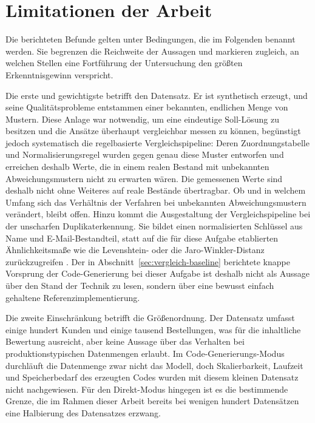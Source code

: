 \section{Limitationen der Arbeit}
\label{sec:limitationen}

Die berichteten Befunde gelten unter Bedingungen, die im Folgenden benannt werden. Sie begrenzen die Reichweite der Aussagen und markieren zugleich, an welchen Stellen eine Fortführung der Untersuchung den größten Erkenntnisgewinn verspricht.

Die erste und gewichtigste betrifft den Datensatz. Er ist synthetisch erzeugt, und seine Qualitätsprobleme entstammen einer bekannten, endlichen Menge von Mustern. Diese Anlage war notwendig, um eine eindeutige Soll-Lösung zu besitzen und die Ansätze überhaupt vergleichbar messen zu können, begünstigt jedoch systematisch die regelbasierte Vergleichspipeline: Deren Zuordnungstabelle und Normalisierungsregel wurden gegen genau diese Muster entworfen und erreichen deshalb Werte, die in einem realen Bestand mit unbekannten Abweichungsmustern nicht zu erwarten wären. Die gemessenen Werte sind deshalb nicht ohne Weiteres auf reale Bestände übertragbar. Ob und in welchem Umfang sich das Verhältnis der Verfahren bei unbekannten Abweichungsmustern verändert, bleibt offen. Hinzu kommt die Ausgestaltung der Vergleichspipeline bei der unscharfen Duplikaterkennung. Sie bildet einen normalisierten Schlüssel aus Name und E-Mail-Bestandteil, statt auf die für diese Aufgabe etablierten Ähnlichkeitsmaße wie die Levenshtein- oder die Jaro-Winkler-Distanz zurückzugreifen \autocite{binetteAlmostAllEntity2022,elmagarmidDuplicateRecordDetection2007}. Der in Abschnitt~\ref{sec:vergleich-baseline} berichtete knappe Vorsprung der Code-Generierung bei dieser Aufgabe ist deshalb nicht als Aussage über den Stand der Technik zu lesen, sondern über eine bewusst einfach gehaltene Referenzimplementierung.

Die zweite Einschränkung betrifft die Größenordnung. Der Datensatz umfasst einige hundert Kunden und einige tausend Bestellungen, was für die inhaltliche Bewertung ausreicht, aber keine Aussage über das Verhalten bei produktionstypischen Datenmengen erlaubt. Im Code-Generierungs-Modus durchläuft die Datenmenge zwar nicht das Modell, doch Skalierbarkeit, Laufzeit und Speicherbedarf des erzeugten Codes wurden mit diesem kleinen Datensatz nicht nachgewiesen. Für den Direkt-Modus hingegen ist es die bestimmende Grenze, die im Rahmen dieser Arbeit bereits bei wenigen hundert Datensätzen eine Halbierung des Datensatzes erzwang.

